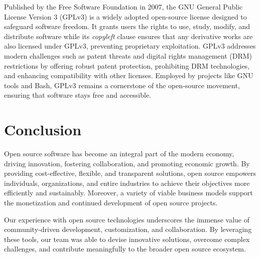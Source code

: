 Published by the Free Software Foundation in 2007, the GNU General Public License Version 3 (GPLv3) is a widely adopted open-source license designed to safeguard software freedom. 
It grants users the rights to use, study, modify, and distribute software while its \textit{copyleft} clause ensures that any derivative works are also licensed under GPLv3, 
preventing proprietary exploitation. GPLv3 addresses modern challenges such as patent threats and digital rights management (DRM) restrictions by offering robust patent protection, prohibiting DRM technologies, 
and enhancing compatibility with other licenses. Employed by projects like GNU tools and Bash, GPLv3 remains a cornerstone of the open-source movement, ensuring that software stays free and accessible.

\section{Conclusion}

Open source software has become an integral part of the modern economy, driving innovation, fostering collaboration, 
and promoting economic growth. By providing cost-effective, flexible, and transparent solutions, open source empowers individuals, 
organizations, and entire industries to achieve their objectives more efficiently and sustainably. Moreover, 
a variety of viable business models support the monetization and continued development of open source projects.

Our experience with open source technologies underscores the immense value of community-driven development, customization, 
and collaboration. By leveraging these tools, our team was able to devise innovative solutions, overcome complex challenges, 
and contribute meaningfully to the broader open source ecosystem.


